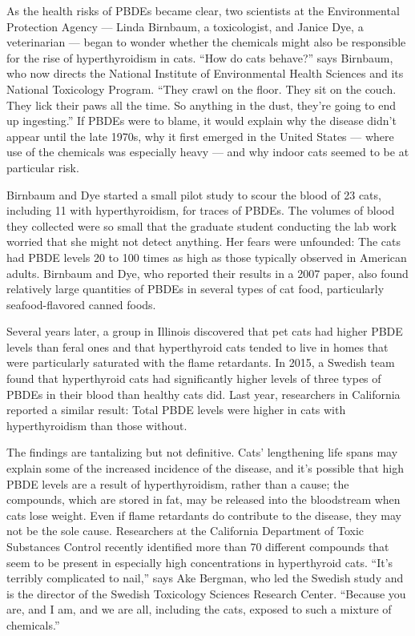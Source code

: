 As the health risks of PBDEs became clear, two scientists at the
Environmental Protection Agency --- Linda Birnbaum, a toxicologist, and
Janice Dye, a veterinarian --- began to wonder whether the chemicals
might also be responsible for the rise of hyperthyroidism in cats. ``How
do cats behave?'' says Birnbaum, who now directs the National Institute
of Environmental Health Sciences and its National Toxicology Program.
``They crawl on the floor. They sit on the couch. They lick their paws
all the time. So anything in the dust, they're going to end up
ingesting.'' If PBDEs were to blame, it would explain why the disease
didn't appear until the late 1970s, why it first emerged in the United
States --- where use of the chemicals was especially heavy --- and why
indoor cats seemed to be at particular risk.

Birnbaum and Dye started a small pilot study to scour the blood of 23
cats, including 11 with hyperthyroidism, for traces of PBDEs. The
volumes of blood they collected were so small that the graduate student
conducting the lab work worried that she might not detect anything. Her
fears were unfounded: The cats had PBDE levels 20 to 100 times as high
as those typically observed in American adults. Birnbaum and Dye, who
reported their results in a 2007 paper, also found relatively large
quantities of PBDEs in several types of cat food, particularly
seafood-flavored canned foods.

Several years later, a group in Illinois discovered that pet cats had
higher PBDE levels than feral ones and that hyperthyroid cats tended to
live in homes that were particularly saturated with the flame
retardants. In 2015, a Swedish team found that hyperthyroid cats had
significantly higher levels of three types of PBDEs in their blood than
healthy cats did. Last year, researchers in California reported a
similar result: Total PBDE levels were higher in cats with
hyperthyroidism than those without.

The findings are tantalizing but not definitive. Cats' lengthening life
spans may explain some of the increased incidence of the disease, and
it's possible that high PBDE levels are a result of hyperthyroidism,
rather than a cause; the compounds, which are stored in fat, may be
released into the bloodstream when cats lose weight. Even if flame
retardants do contribute to the disease, they may not be the sole cause.
Researchers at the California Department of Toxic Substances Control
recently identified more than 70 different compounds that seem to be
present in especially high concentrations in hyperthyroid cats. ``It's
terribly complicated to nail,'' says Ake Bergman, who led the Swedish
study and is the director of the Swedish Toxicology Sciences Research
Center. ``Because you are, and I am, and we are all, including the cats,
exposed to such a mixture of chemicals.''

